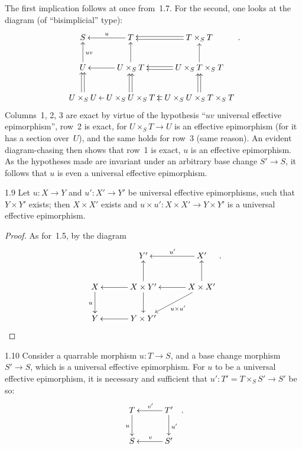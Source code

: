 The first implication follows at once from~1.7. For the second, one looks
at the diagram (of ``bisimplicial'' type):
{\footnotesize\[
\xymatrix@C=0.55em@R=2.2em{
S
  & T \ar[l]_{u}
  & T\times_{S}T \ar@<0.4ex>[l] \ar@<-0.4ex>[l]
\\
U \ar[u]_{uv}
  & U\times_{S}T \ar[l] \ar[u]
  & U\times_{S}T\times_{S}T
      \ar@<0.4ex>[l] \ar@<-0.4ex>[l] \ar[u]
\\
U\times_{S}U \ar@<0.4ex>[u] \ar@<-0.4ex>[u]
  & U\times_{S}U\times_{S}T \ar[l]
      \ar@<0.4ex>[u] \ar@<-0.4ex>[u]
  & U\times_{S}U\times_{S}T\times_{S}T
      \ar@<0.4ex>[l] \ar@<-0.4ex>[l]
      \ar@<0.4ex>[u] \ar@<-0.4ex>[u]
}
\,.
\]}
Columns~1, 2, 3 are exact by virtue of the hypothesis ``\(uv\) universal
effective epimorphism'', row~2 is exact, for \(U\times_{S}T\to U\) is an
effective epimorphism (for it has a section over~\(U\)), and the same holds
for row~3 (same reason). An evident diagram-chasing then shows that row~1
is exact, \ie \(u\) is an effective epimorphism. As the hypotheses made are
invariant under an arbitrary base change \(S'\to S\), it follows that \(u\)
is even a universal effective epimorphism.

\begin{corollary}{1.9}
\label{IV.1.9}
Let \(u\colon X\to Y\) and \(u'\colon X'\to Y'\) be universal effective
epimorphisms, such that \(Y\times Y'\) exists; then \(X\times X'\) exists
and \(u\times u'\colon X\times X'\to Y\times Y'\) is a universal effective
epimorphism.
\end{corollary}

\begin{proof}
As for~1.5, by the diagram
\[
\xymatrix@C=3.2em@R=2.4em{
  & Y'
  & X' \ar[l]_{u'}
\\
X \ar[d]_{u}
  & X\times Y' \ar[l] \ar[u] \ar[d]
  & X\times X' \ar[l] \ar[u] \ar[dl]^{u\times u'}
\\
Y
  & Y\times Y' \ar[l]
  &
}
\,.
\]
\end{proof}

\begin{corollary}{1.10}
\label{IV.1.10}
Consider a quarrable morphism \(u\colon T\to S\), and a base change morphism
\(S'\to S\), which is a universal effective epimorphism. For \(u\) to be a
universal effective epimorphism, it is necessary and sufficient that
\(u'\colon T'=T\times_{S}S'\to S'\) be so:
\[
\xymatrix@C=3em@R=2.4em{
T \ar[d]_{u}
  & T' \ar[l]_{v'} \ar[d]^{u'}
\\
S
  & S' \ar[l]_{v}
}
\,.
\]
\end{corollary}

